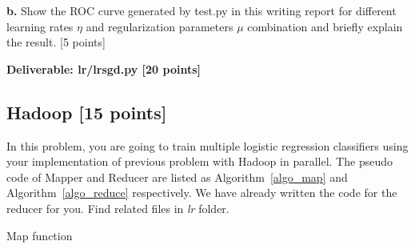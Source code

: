 \documentclass[12pt]{article}
\begin{document}
\textbf{b.} Show the ROC curve generated by test.py in this writing report for different learning rates $\eta$ and regularization parameters $\mu$ combination and briefly explain the result. [5 points]
\iffalse
\textbf{c.} [Extra 10 points \textbf{(no partial credit!)}] Implement using the result of question \textbf{1.2.f}, and show the speed up. Test efficiency of your approach using larger data set \textit{training.data}, which has 5675 possible distinct features. Save the code in a new file lrsgd\_fast.py. We will test whether your code can finish witin reasonable amount of time and correctness of trained model. The training and testing data set can be downloaded from:

\begin{lstlisting}[frame=single,language=bash]
http://sunlab.org/download/course/hw2/training.data
http://sunlab.org/download/course/hw2/testing.data
\end{lstlisting}
\textbf{Deliverable: lr/lrsgd.py and optional lr/lrsgd\_fast.py [15 points]}
\fi



\textbf{Deliverable: lr/lrsgd.py [20 points]}

\subsection{Hadoop [15 points]}
In this problem, you are going to train multiple logistic regression classifiers using your implementation of previous problem with Hadoop in parallel. The pseudo code of Mapper and Reducer are listed as Algorithm~\ref{algo_map} and Algorithm~\ref{algo_reduce} respectively. We have already written the code for the reducer for you. Find related files in \textit{lr} folder.

\begin{algorithm}
\BlankLine
{}
\caption{Map function}\label{algo_map}
\end{algorithm}
\end{document}
